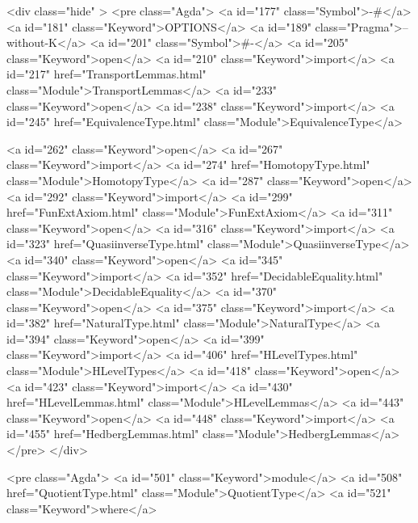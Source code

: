   <div class="hide" >
<pre class="Agda">
<a id="177" class="Symbol">{-#</a> <a id="181" class="Keyword">OPTIONS</a> <a id="189" class="Pragma">--without-K</a> <a id="201" class="Symbol">#-}</a>
<a id="205" class="Keyword">open</a> <a id="210" class="Keyword">import</a> <a id="217" href="TransportLemmas.html" class="Module">TransportLemmas</a>
<a id="233" class="Keyword">open</a> <a id="238" class="Keyword">import</a> <a id="245" href="EquivalenceType.html" class="Module">EquivalenceType</a>

<a id="262" class="Keyword">open</a> <a id="267" class="Keyword">import</a> <a id="274" href="HomotopyType.html" class="Module">HomotopyType</a>
<a id="287" class="Keyword">open</a> <a id="292" class="Keyword">import</a> <a id="299" href="FunExtAxiom.html" class="Module">FunExtAxiom</a>
<a id="311" class="Keyword">open</a> <a id="316" class="Keyword">import</a> <a id="323" href="QuasiinverseType.html" class="Module">QuasiinverseType</a>
<a id="340" class="Keyword">open</a> <a id="345" class="Keyword">import</a> <a id="352" href="DecidableEquality.html" class="Module">DecidableEquality</a>
<a id="370" class="Keyword">open</a> <a id="375" class="Keyword">import</a> <a id="382" href="NaturalType.html" class="Module">NaturalType</a>
<a id="394" class="Keyword">open</a> <a id="399" class="Keyword">import</a> <a id="406" href="HLevelTypes.html" class="Module">HLevelTypes</a>
<a id="418" class="Keyword">open</a> <a id="423" class="Keyword">import</a> <a id="430" href="HLevelLemmas.html" class="Module">HLevelLemmas</a>
<a id="443" class="Keyword">open</a> <a id="448" class="Keyword">import</a> <a id="455" href="HedbergLemmas.html" class="Module">HedbergLemmas</a>
</pre>
</div>

<pre class="Agda">
<a id="501" class="Keyword">module</a> <a id="508" href="QuotientType.html" class="Module">QuotientType</a> <a id="521" class="Keyword">where</a>

